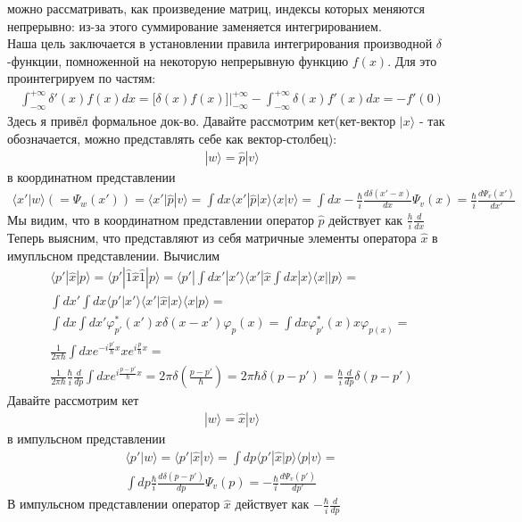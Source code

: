 можно рассматривать, как произведение матриц, индексы которых меняются непрерывно: из-за этого суммирование заменяется интегрированием.\\
Наша цель заключается в установлении правила интегрирования производной $\delta$-функции, помноженной на некоторую непрерывную функцию $f(x)$. Для это проинтегрируем по частям:
\begin{gather*}
\int_{-\infty}^{+\infty}{\delta'(x)f(x)dx} = \big[\delta(x)f(x)\big]\bigg|_{-\infty}^{+\infty} - \int_{-\infty}^{+\infty}{\delta(x)f'(x)dx} = -f'(0)
\end{gather*}
Здесь я привёл формальное док-во. Давайте рассмотрим кет(кет-вектор $|x\rangle$ - так обозначается, можно представлять себе как вектор-столбец):
\begin{gather*}
|w\rangle = \widehat{p}|v\rangle
\end{gather*}
в координатном представлении
\begin{gather*}
\langle x'|w\rangle (=\Psi_w(x')) = \langle x'|\widehat{p}|v\rangle = \int{dx}\langle x'|\widehat{p}|x\rangle\langle x|v\rangle = \int{dx} - \frac{\hbar}{i}\frac{d\delta(x' - x)}{dx}\Psi_v(x) = \frac{\hbar}{i}\frac{d\Psi_v(x')}{dx'}
\end{gather*}
Мы видим, что в координатном представлении оператор $\widehat{p}$ действует как $\frac{h}{i}\frac{d}{dx}$ \\
Теперь выясним, что представляют из себя матричные элементы оператора $\widehat{x}$ в имупльсном представлении. Вычислим
\begin{gather*}
\langle p'|\widehat{x}|p\rangle = \langle p'|\widehat{1}\widehat{x}\widehat{1}|p\rangle = \langle p'|\int{dx'}|x'\rangle\langle x'|\widehat{x}\int{dx}|x\rangle\langle x||p\rangle = \\
\int{dx'}\int{dx}\langle p'|x'\rangle\langle x'|\widehat{x}|x\rangle\langle x|p\rangle = \\
\int{dx}\int{dx'}\varphi_{p'}^{*}(x')x\delta(x - x')\varphi_{p}(x) = \int{dx}\varphi_{p'}^{*}(x)x\varphi_{p(x)} =\\
\frac{1}{2\pi\hbar}\int{dx}e^{-i\frac{p'}{\hbar}x}xe^{i\frac{p}{\hbar}x} =\\
\frac{1}{2\pi\hbar}\frac{\hbar}{i}\frac{d}{dp}\int{dx}e^{i\frac{p - p'}{\hbar}x} = 2\pi\delta(\frac{p - p'}{\hbar}) = 2\pi\hbar\delta(p - p') = \frac{\hbar}{i}\frac{d}{dp}\delta(p - p')
\end{gather*}
Давайте рассмотрим кет 
\begin{gather*}
|w\rangle = \widehat{x}|v\rangle
\end{gather*}
в импульсном представлении
\begin{gather*}
\langle p'|w\rangle = \langle p'|\widehat{x}|v\rangle = \int{dp}\langle p'|\widehat{x}|p\rangle\langle p|v\rangle =\\ \int{dp}\frac{\hbar}{i}\frac{d\delta(p - p')}{dp}\Psi_{v}(p) = -\frac{\hbar}{i}\frac{d\Psi_{v}(p')}{dp'}
\end{gather*}
В импульсном представлении оператор $\widehat{x}$ действует как $-\frac{\hbar}{i}\frac{d}{dp}$
